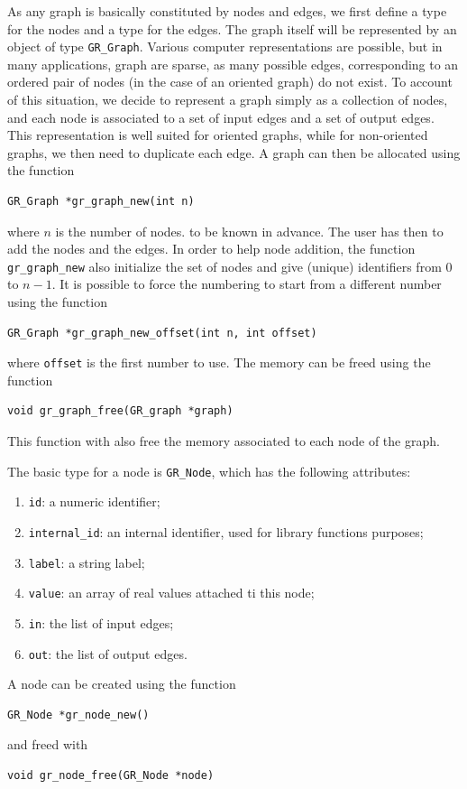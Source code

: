 As any graph is basically constituted by nodes and edges, we first define a type for the nodes and a type for the edges.
The graph itself will be represented by an object of type \verb|GR_Graph|.
Various computer representations are possible, but in many applications, graph are sparse,
as many possible edges, corresponding to an ordered pair of nodes (in the case of an oriented
graph) do not exist.
To account of this situation, we decide to represent a graph simply as a collection of nodes, and each node is associated to a set of input edges and a set of output edges.
This representation is well suited for oriented graphs, while for non-oriented graphs, we then need to duplicate each edge.
A graph can then be allocated using the function
\begin{verbatim}
GR_Graph *gr_graph_new(int n)
\end{verbatim}
where $n$ is the number of nodes. to be known in advance.
The user has then to add the nodes and the edges.
In order to help node addition, the function \verb|gr_graph_new| also initialize the set of nodes and give (unique) identifiers from $0$ to $n-1$.
It is possible to force the numbering to start from a different number using the function
\begin{verbatim}
GR_Graph *gr_graph_new_offset(int n, int offset)
\end{verbatim}
where \verb|offset| is the first number to use.
The memory can be freed using the function
\begin{verbatim}
void gr_graph_free(GR_graph *graph)
\end{verbatim}
This function with also free the memory associated to each node of the graph.

The basic type for a node is \verb|GR_Node|, which has the following attributes:
\begin{enumerate}
\item
\verb|id|: a numeric identifier;
\item
\verb|internal_id|: an internal identifier, used for library functions purposes;
\item
\verb|label|: a string label;
\item
\verb|value|: an array of real values attached ti this node;
\item
\verb|in|: the list of input edges;
\item
\verb|out|: the list of output edges.
\end{enumerate}
A node can be created using the function
\begin{verbatim}
GR_Node *gr_node_new()
\end{verbatim}
and freed with
\begin{verbatim}
void gr_node_free(GR_Node *node)
\end{verbatim}

